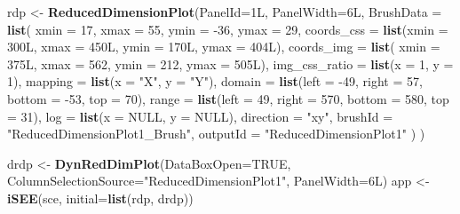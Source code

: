 \documentclass[
]{book}
\newenvironment{Shaded}{\begin{snugshade}}{\end{snugshade}}
\newcommand{\DataTypeTok}[1]{\textcolor[rgb]{0.13,0.29,0.53}{#1}}
\newcommand{\DecValTok}[1]{\textcolor[rgb]{0.00,0.00,0.81}{#1}}
\newcommand{\KeywordTok}[1]{\textcolor[rgb]{0.13,0.29,0.53}{\textbf{#1}}}
\newcommand{\NormalTok}[1]{#1}
\newcommand{\OtherTok}[1]{\textcolor[rgb]{0.56,0.35,0.01}{#1}}
\newcommand{\StringTok}[1]{\textcolor[rgb]{0.31,0.60,0.02}{#1}}
\begin{document}
\begin{Shaded}
\begin{Highlighting}[]
\NormalTok{rdp <-}\StringTok{ }\KeywordTok{ReducedDimensionPlot}\NormalTok{(}\DataTypeTok{PanelId=}\NormalTok{1L, }\DataTypeTok{PanelWidth=}\NormalTok{6L,}
    \DataTypeTok{BrushData =} \KeywordTok{list}\NormalTok{(}
        \DataTypeTok{xmin =} \DecValTok{17}\NormalTok{, }\DataTypeTok{xmax =} \DecValTok{55}\NormalTok{, }\DataTypeTok{ymin =} \DecValTok{-36}\NormalTok{, }\DataTypeTok{ymax =} \DecValTok{29}\NormalTok{,}
        \DataTypeTok{coords_css =} \KeywordTok{list}\NormalTok{(}\DataTypeTok{xmin =}\NormalTok{ 300L, }\DataTypeTok{xmax =}\NormalTok{ 450L, }\DataTypeTok{ymin =}\NormalTok{ 170L, }\DataTypeTok{ymax =}\NormalTok{ 404L),}
        \DataTypeTok{coords_img =} \KeywordTok{list}\NormalTok{( }\DataTypeTok{xmin =}\NormalTok{ 375L, }\DataTypeTok{xmax =} \DecValTok{562}\NormalTok{, }\DataTypeTok{ymin =} \DecValTok{212}\NormalTok{, }\DataTypeTok{ymax =}\NormalTok{ 505L),}
        \DataTypeTok{img_css_ratio =} \KeywordTok{list}\NormalTok{(}\DataTypeTok{x =} \DecValTok{1}\NormalTok{, }\DataTypeTok{y =} \DecValTok{1}\NormalTok{),}
        \DataTypeTok{mapping =} \KeywordTok{list}\NormalTok{(}\DataTypeTok{x =} \StringTok{"X"}\NormalTok{, }\DataTypeTok{y =} \StringTok{"Y"}\NormalTok{),}
        \DataTypeTok{domain =} \KeywordTok{list}\NormalTok{(}\DataTypeTok{left =} \DecValTok{-49}\NormalTok{, }\DataTypeTok{right =} \DecValTok{57}\NormalTok{, }\DataTypeTok{bottom =} \DecValTok{-53}\NormalTok{, }\DataTypeTok{top =} \DecValTok{70}\NormalTok{),}
        \DataTypeTok{range =} \KeywordTok{list}\NormalTok{(}\DataTypeTok{left =} \DecValTok{49}\NormalTok{, }\DataTypeTok{right =} \DecValTok{570}\NormalTok{, }\DataTypeTok{bottom =} \DecValTok{580}\NormalTok{, }\DataTypeTok{top =} \DecValTok{31}\NormalTok{),}
        \DataTypeTok{log =} \KeywordTok{list}\NormalTok{(}\DataTypeTok{x =} \OtherTok{NULL}\NormalTok{, }\DataTypeTok{y =} \OtherTok{NULL}\NormalTok{),}
        \DataTypeTok{direction =} \StringTok{"xy"}\NormalTok{, }\DataTypeTok{brushId =} \StringTok{"ReducedDimensionPlot1_Brush"}\NormalTok{,}
        \DataTypeTok{outputId =} \StringTok{"ReducedDimensionPlot1"}
\NormalTok{    )}
\NormalTok{)}

\NormalTok{drdp <-}\StringTok{ }\KeywordTok{DynRedDimPlot}\NormalTok{(}\DataTypeTok{DataBoxOpen=}\OtherTok{TRUE}\NormalTok{, }\DataTypeTok{ColumnSelectionSource=}\StringTok{"ReducedDimensionPlot1"}\NormalTok{, }\DataTypeTok{PanelWidth=}\NormalTok{6L)}
\NormalTok{app <-}\StringTok{ }\KeywordTok{iSEE}\NormalTok{(sce, }\DataTypeTok{initial=}\KeywordTok{list}\NormalTok{(rdp, drdp))}
\end{Highlighting}
\end{Shaded}
\end{document}
